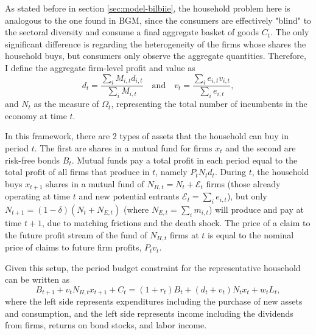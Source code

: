 \documentclass[a4paper,12pt]{article} %
\numberwithin{equation}{section} %
\numberwithin{figure}{section}
\numberwithin{table}{section}
\begin{document}
As stated before in section \ref{sec:model-bilbiie}, the household problem here is analogous to the one found in BGM, since the consumers are
effectively "blind" to the sectoral diversity and consume a final aggregate basket of goods $C_t$. The only significant difference is regarding
the heterogeneity of the firms whose shares the household buys, but consumers only observe the aggregate quantities. Therefore, I define the aggregate
firm-level profit and value as 
$$
    d_{t} = \frac{\sum_iM_{i,t}d_{i,t}}{\sum_iM_{i,t}} \quad \text{and} \quad v_{t} = \frac{\sum_ie_{i,t}v_{i,t}}{\sum_ie_{i,t}},
$$
and $N_t$ as the measure of $\Omega_t$, representing the total number of incumbents in the economy at time $t$.

In this framework, there are 
2 types of assets that the household can buy in period $t$. The first are shares in a mutual fund for firms $x_t$ and the second are 
risk-free bonds $B_t$. Mutual funds pay a total profit in each period equal to the total profit of all firms that produce in $t$, namely $P_tN_td_t$. 
During $t$, the household buys $x_{t+1}$ shares in a mutual fund of $N_{H,t} = N_t + \mathcal{E}_{t}$ firms (those already operating at 
time $t$ and new potential entrants $\mathcal{E}_t = \sum_ie_{i,t}$), but only $N_{t+1} = (1-\delta)(N_t +N_{E,t})$ (where $N_{E,t} = 
\sum_im_{i,t}$) will produce and pay at time $t+1$, due to matching frictions and the death shock. The price of a claim to the 
future profit stream of the fund of $N_{H,t}$ firms at $t$ is equal to the nominal price of claims to future firm profits, $P_tv_t$.

Given this setup, the period budget constraint for the representative household can be written as
$$B_{t+1} + v_t N_{H,t} x_{t+1} + C_t = (1 + r_t) B_t + (d_t + v_t) N_t x_t + w_t L_t,$$
where the left side represents expenditures including the purchase of new assets and consumption, and the left side represents income
including the dividends from firms, returns on bond stocks, and labor income.
\end{document}

